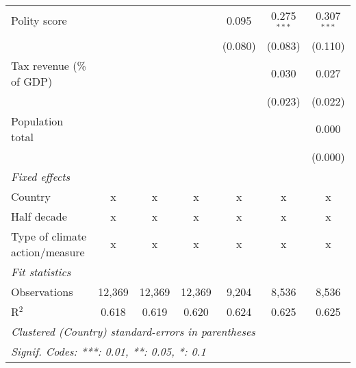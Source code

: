 \begin{tabular}{lcccccc}
   Polity score                                               &         &                &                & 0.095          & 0.275$^{***}$  & 0.307$^{***}$\\   
                                                              &         &                &                & (0.080)        & (0.083)        & (0.110)\\   
   Tax revenue (\% of GDP)                                    &         &                &                &                & 0.030          & 0.027\\   
                                                              &         &                &                &                & (0.023)        & (0.022)\\   
   Population total                                           &         &                &                &                &                & 0.000\\   
                                                              &         &                &                &                &                & (0.000)\\   
   \emph{Fixed effects}\\
   Country                                                    & x       & x              & x              & x              & x              & x\\  
   Half decade                                                & x       & x              & x              & x              & x              & x\\  
   Type of climate action/measure                             & x       & x              & x              & x              & x              & x\\  
   \midrule \emph{Fit statistics}\\
   Observations                                               & 12,369  & 12,369         & 12,369         & 9,204          & 8,536          & 8,536\\  
   R$^2$                                                      & 0.618   & 0.619          & 0.620          & 0.624          & 0.625          & 0.625\\  
   \midrule
   \multicolumn{7}{l}{\emph{Clustered (Country) standard-errors in parentheses}}\\
   \multicolumn{7}{l}{\emph{Signif. Codes: ***: 0.01, **: 0.05, *: 0.1}}\\
\end{tabular}
\par\endgroup


